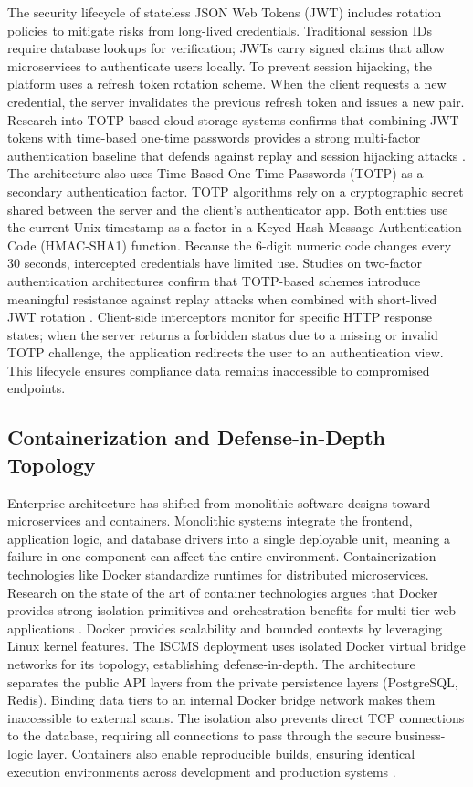 The security lifecycle of stateless JSON Web Tokens (JWT) includes rotation policies to mitigate risks from long-lived credentials. Traditional session IDs require database lookups for verification; JWTs carry signed claims that allow microservices to authenticate users locally. To prevent session hijacking, the platform uses a refresh token rotation scheme. When the client requests a new credential, the server invalidates the previous refresh token and issues a new pair. Research into TOTP-based cloud storage systems confirms that combining JWT tokens with time-based one-time passwords provides a strong multi-factor authentication baseline that defends against replay and session hijacking attacks \cite{ahmad2025totp}. The architecture also uses Time-Based One-Time Passwords (TOTP) as a secondary authentication factor. TOTP algorithms rely on a cryptographic secret shared between the server and the client's authenticator app. Both entities use the current Unix timestamp as a factor in a Keyed-Hash Message Authentication Code (HMAC-SHA1) function. Because the 6-digit numeric code changes every 30 seconds, intercepted credentials have limited use. Studies on two-factor authentication architectures confirm that TOTP-based schemes introduce meaningful resistance against replay attacks when combined with short-lived JWT rotation \cite{amer2024biometric}. Client-side interceptors monitor for specific HTTP response states; when the server returns a forbidden status due to a missing or invalid TOTP challenge, the application redirects the user to an authentication view. This lifecycle ensures compliance data remains inaccessible to compromised endpoints.

\subsection{Containerization and Defense-in-Depth Topology}
Enterprise architecture has shifted from monolithic software designs toward microservices and containers. Monolithic systems integrate the frontend, application logic, and database drivers into a single deployable unit, meaning a failure in one component can affect the entire environment. Containerization technologies like Docker standardize runtimes for distributed microservices. Research on the state of the art of container technologies argues that Docker provides strong isolation primitives and orchestration benefits for multi-tier web applications \cite{casalicchio2020state}. Docker provides scalability and bounded contexts by leveraging Linux kernel features. The ISCMS deployment uses isolated Docker virtual bridge networks for its topology, establishing defense-in-depth. The architecture separates the public API layers from the private persistence layers (PostgreSQL, Redis). Binding data tiers to an internal Docker bridge network makes them inaccessible to external scans. The isolation also prevents direct TCP connections to the database, requiring all connections to pass through the secure business-logic layer. Containers also enable reproducible builds, ensuring identical execution environments across development and production systems \cite{thokala2025utilizing}.

